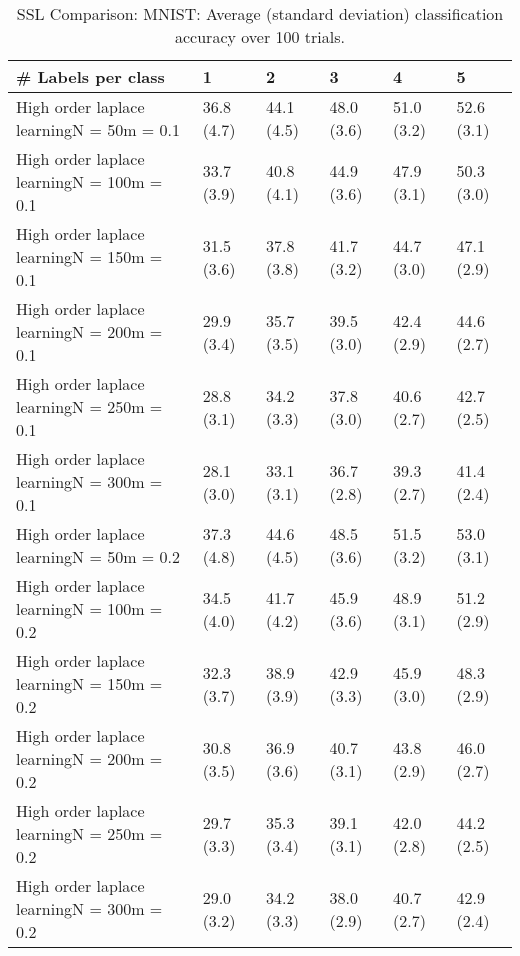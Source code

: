 \documentclass{article}
\begin{document}
\begin{table*}[t!]
\vspace{-3mm}
\caption{SSL Comparison: MNIST: Average (standard deviation) classification accuracy over 100 trials.}
\vspace{-3mm}
\label{tab:SSL Comparison: MNIST}
\vskip 0.15in
\begin{center}
\begin{small}
\begin{sc}
\begin{tabular}{llllll}
\toprule
\# Labels per class&\textbf{1}&\textbf{2}&\textbf{3}&\textbf{4}&\textbf{5}\\
\midrule
High order laplace learningN = 50m = 0.1&36.8 (4.7)      &44.1 (4.5)      &48.0 (3.6)      &51.0 (3.2)      &52.6 (3.1)      \\
High order laplace learningN = 100m = 0.1&33.7 (3.9)      &40.8 (4.1)      &44.9 (3.6)      &47.9 (3.1)      &50.3 (3.0)      \\
High order laplace learningN = 150m = 0.1&31.5 (3.6)      &37.8 (3.8)      &41.7 (3.2)      &44.7 (3.0)      &47.1 (2.9)      \\
High order laplace learningN = 200m = 0.1&29.9 (3.4)      &35.7 (3.5)      &39.5 (3.0)      &42.4 (2.9)      &44.6 (2.7)      \\
High order laplace learningN = 250m = 0.1&28.8 (3.1)      &34.2 (3.3)      &37.8 (3.0)      &40.6 (2.7)      &42.7 (2.5)      \\
High order laplace learningN = 300m = 0.1&28.1 (3.0)      &33.1 (3.1)      &36.7 (2.8)      &39.3 (2.7)      &41.4 (2.4)      \\
High order laplace learningN = 50m = 0.2&37.3 (4.8)      &44.6 (4.5)      &48.5 (3.6)      &51.5 (3.2)      &53.0 (3.1)      \\
High order laplace learningN = 100m = 0.2&34.5 (4.0)      &41.7 (4.2)      &45.9 (3.6)      &48.9 (3.1)      &51.2 (2.9)      \\
High order laplace learningN = 150m = 0.2&32.3 (3.7)      &38.9 (3.9)      &42.9 (3.3)      &45.9 (3.0)      &48.3 (2.9)      \\
High order laplace learningN = 200m = 0.2&30.8 (3.5)      &36.9 (3.6)      &40.7 (3.1)      &43.8 (2.9)      &46.0 (2.7)      \\
High order laplace learningN = 250m = 0.2&29.7 (3.3)      &35.3 (3.4)      &39.1 (3.1)      &42.0 (2.8)      &44.2 (2.5)      \\
High order laplace learningN = 300m = 0.2&29.0 (3.2)      &34.2 (3.3)      &38.0 (2.9)      &40.7 (2.7)      &42.9 (2.4)      \\

\end{tabular}
\end{sc}
\end{small}
\end{center}
\end{table*}
\end{document}
